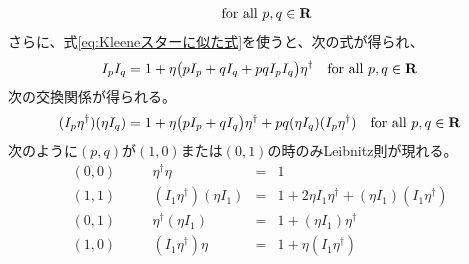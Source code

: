 {\begin{equation*}
\begin{split}
		\quad\text{for all } p,q\in\mathbf{R}
	\end{split}\end{equation*}
	さらに、式\eqref{eq:Kleeneスターに似た式}を使うと、次の式が得られ、
	\begin{equation*}\begin{split}
		I_pI_q = 1 + \eta\bigl(pI_p + qI_q + pqI_pI_q\bigr)\eta^\dag
		\quad\text{for all } p,q\in\mathbf{R}
	\end{split}\end{equation*}
	次の交換関係が得られる。
	\begin{equation*}\begin{split}
		(I_p\eta^\dag)(\eta I_q) = 1 + \eta\bigl(pI_p+qI_q\bigr)\eta^\dag
			+ pq(\eta I_q)(I_p\eta^\dag) \quad\text{for all } p,q\in\mathbf{R}
	\end{split}\end{equation*}
	次のように$(p,q)$が$(1,0)$または$(0,1)$の時のみLeibnitz則が現れる。
	\begin{equation*}\begin{array}{lcrcl}
		(0,0) &\quad& \eta^\dag\eta &=& 1 \\
		(1,1) &\quad& (I_1\eta^\dag)(\eta I_1) &=& 1 + 2\eta I_1\eta^\dag 
			+ (\eta I_1)(I_1\eta^\dag) \\
		(0,1) &\quad& \eta^\dag(\eta I_1) &=& 1 + (\eta I_1)\eta^\dag \\
		(1,0) &\quad& (I_1\eta^\dag)\eta &=& 1 + \eta(I_1\eta^\dag) \\
	\end{array}\end{equation*}

}
